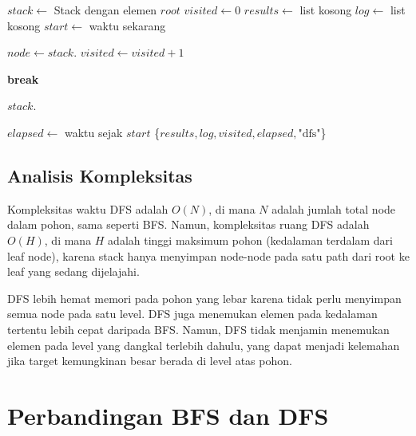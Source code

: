 \begin{algorithm}
\caption{DFS untuk Penelusuran Pohon DOM}
\label{alg:dfs}
\begin{algorithmic}[1]
    \State $stack \gets$ Stack dengan elemen $root$
    \State $visited \gets 0$
    \State $results \gets$ list kosong
    \State $log \gets$ list kosong
    \State $start \gets$ waktu sekarang
    
        \State $node \gets stack.$
        \State $visited \gets visited + 1$
        
            \State {}
            \State {}
                \State \textbf{break}
            \EndIf
        \Else
            \State {}
        \EndIf
        
            \State $stack.$
        \EndFor
    \EndWhile
    
    \State $elapsed \gets$ waktu sejak $start$
    \State \Return \{$results, log, visited, elapsed, \text{"dfs"}$\}
\EndFunction
\end{algorithmic}
\end{algorithm}

\subsection{Analisis Kompleksitas}

Kompleksitas waktu DFS adalah $O(N)$, di mana $N$ adalah jumlah total node dalam
pohon, sama seperti BFS. Namun, kompleksitas ruang DFS adalah $O(H)$, di mana $H$
adalah tinggi maksimum pohon (kedalaman terdalam dari leaf node), karena stack
hanya menyimpan node-node pada satu path dari root ke leaf yang sedang dijelajahi.

DFS lebih hemat memori pada pohon yang lebar karena tidak perlu menyimpan semua
node pada satu level. DFS juga menemukan elemen pada kedalaman tertentu lebih
cepat daripada BFS. Namun, DFS tidak menjamin menemukan elemen pada level yang
dangkal terlebih dahulu, yang dapat menjadi kelemahan jika target kemungkinan
besar berada di level atas pohon.

\section{Perbandingan BFS dan DFS}

